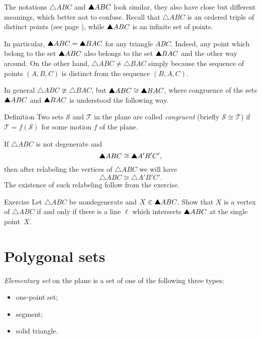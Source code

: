The notations $\triangle ABC$ and $\solidtriangle ABC$ look similar,
they also have close but different meanings, 
which better not to confuse.
Recall that $\triangle ABC$ is an ordered triple of distinct points
(see page \pageref{page:def:triangle}),
while $\solidtriangle ABC$ is an infinite set of points.

In particular, $\solidtriangle ABC=\solidtriangle BAC$ for any triangle $ABC$.
Indeed, any point which belong to the set $\solidtriangle ABC$ 
also belongs to the set $\solidtriangle BAC$
and the other way around.
On the other hand,
$\triangle ABC\ne\triangle BAC$ simply because the sequence of points $(A,B,C)$ is distinct from the sequence $(B,A,C)$.

In general  $\triangle ABC\ncong\triangle BAC$, but $\solidtriangle ABC\cong\solidtriangle BAC$, where congruence of the sets $\solidtriangle ABC$ and $\solidtriangle BAC$ 
is understood the following way.

\begin{thm}{Definition}\label{def:cong-sets}
Two sets $\mathcal{S}$ and $\mathcal{T}$ in the plane  
are called \emph{congruent} 
(briefly $\mathcal{S}\cong \mathcal{T}$)
if 
$\mathcal{T}=f(\mathcal{S})$ for some motion $f$ of the plane.
\end{thm}

If $\triangle ABC$ is not degenerate
and \[\solidtriangle ABC\cong \solidtriangle A'B'C',\]
then after relabeling the vertices of $\triangle ABC$ 
we will have 
\[\triangle ABC\cong \triangle A'B'C'.\]
The existence of such relabeling follow from the exercise.

\begin{thm}{Exercise}\label{ex:vertex}
Let $\triangle ABC$ be nondegenerate and $X\z\in \solidtriangle ABC$.
Show that $X$ is a vertex of $\triangle ABC$
if and only if there is a line $\ell$ which intersects $\solidtriangle ABC$
at the single point~$X$.
\end{thm}

\section*{Polygonal sets}

\emph{Elementary set} on the plane 
is a set of one of the following three types:
\begin{itemize}
 \item one-point set;
 \item segment;
 \item solid triangle.
\end{itemize}


